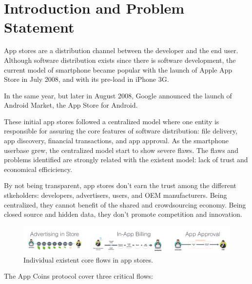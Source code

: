 
\section{Introduction and Problem Statement}



App stores are a distribution channel between the developer and the end user. Although software distribution exists since there is software development, the current model of smartphone became popular with the launch of Apple App Store in July 2008, and with its pre-load in iPhone 3G.

In the same year, but later in August 2008, Google announced the launch of Android Market\cite{wiki:market}, the App Store for Android.

These initial app stores followed a centralized model where one entity is responsible for assuring the core features of software distribution: file delivery, app discovery, financial transactions, and app approval. As the smartphone userbase grew, the centralized model start to show severe flaws. The flaws and problems identified are strongly related with the existent model: lack of trust and economical efficiciency. 

By not being transparent, app stores don't earn the trust among the different stkeholders: developers, advertisers, users, and OEM manufacturers. Being centralized, they cannot benefit of the shared and crowdsourcing economy. Being closed source and hidden data, they don't promote competition and innovation.

\begin{figure}[!ht]
\centering
\includegraphics[width=\textwidth]{diagrams/current_flows.png}
\caption{Individual existent core flows in app stores.}
\label{fig:exist_flows}
\end{figure}


The App Coins protocol cover three critical flows:

